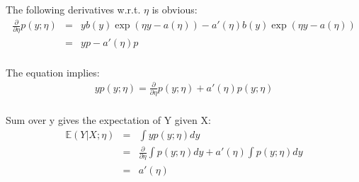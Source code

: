 \begin{answer}

The following derivatives w.r.t. $\eta$ is obvious:
\begin{eqnarray*}
\frac{\partial}{\partial \eta} p(y;\eta)
    &=& y b(y)\exp(\eta y -a(\eta)) - a'(\eta) b(y) \exp(\eta y - a(\eta)) \\
    &=& y p - a'(\eta) p \\
\end{eqnarray*}

The equation implies: 
\begin{eqnarray*}
    y p(y;\eta) =\frac{\partial}{\partial \eta} p(y;\eta) + a'(\eta) p(y;\eta) \\
\end{eqnarray*}

Sum over y gives the expectation of Y given X:
\begin{eqnarray*}
\mathbb{E}(Y|X;\eta)
    &=& \int y p(y;\eta) dy \\
    &=& \frac{\partial}{\partial \eta}\int p(y;\eta)dy + a'(\eta)\int p(y;\eta)dy \\
    &=& a'(\eta)
\end{eqnarray*}
\end{answer}
